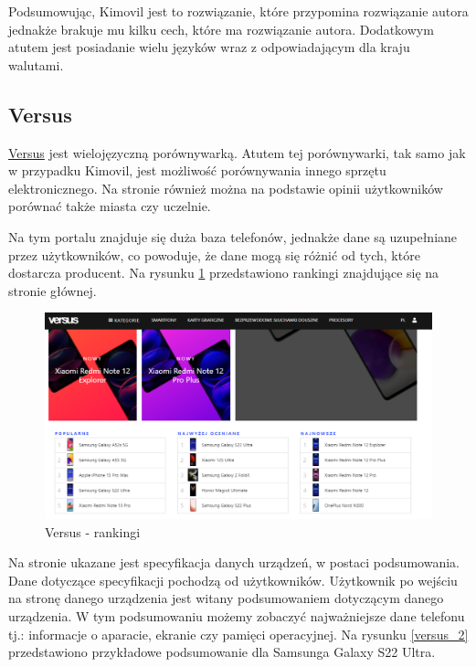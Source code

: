 Podsumowując, Kimovil jest to rozwiązanie, które przypomina rozwiązanie autora jednakże brakuje mu kilku cech, które ma rozwiązanie autora. Dodatkowym atutem jest posiadanie wielu języków wraz z odpowiadającym dla kraju walutami.

\subsection{Versus}
\href{https://versus.com/}{Versus} \cite{versus} jest wielojęzyczną porównywarką. Atutem tej porównywarki, tak samo jak w przypadku Kimovil, jest możliwość porównywania innego sprzętu elektronicznego. Na stronie również można na podstawie opinii użytkowników porównać także miasta czy uczelnie.

Na tym portalu znajduje się duża baza telefonów, jednakże dane są uzupełniane przez użytkowników, co powoduje, że dane mogą się różnić od tych, które dostarcza producent. Na rysunku \ref*{versus_1} przedstawiono rankingi znajdujące się na stronie głównej.
\begin{figure}[H]
    \centering
    \includegraphics[scale=0.45]{img/versus/versusRankingi.png}
    \caption{Versus - rankingi}
    \label{versus_1}
\end{figure}
Na stronie ukazane jest specyfikacja danych urządzeń, w postaci podsumowania. Dane dotyczące specyfikacji pochodzą od użytkowników. Użytkownik po wejściu na stronę danego urządzenia jest witany podsumowaniem dotyczącym danego urządzenia. W tym podsumowaniu możemy zobaczyć najważniejsze dane telefonu tj.: informacje o aparacie, ekranie czy pamięci operacyjnej. Na rysunku \ref*{versus_2} przedstawiono przykładowe podsumowanie dla Samsunga Galaxy S22 Ultra.
